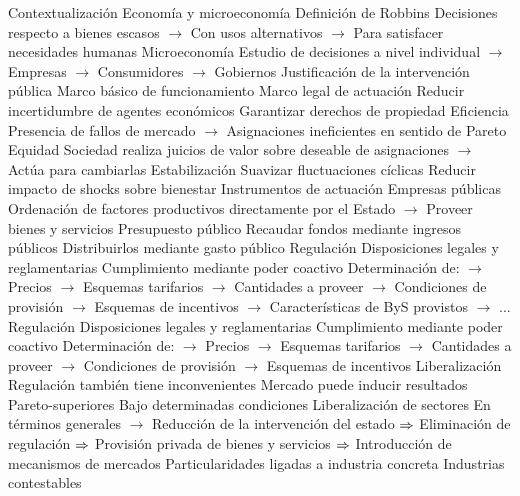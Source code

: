 \documentclass{nuevotema}
\begin{document}
\esquemalargo

\begin{esquemal}
	\1[] 
		\2 Contextualización
			\3 Economía y microeconomía
				\4 Definición de Robbins
				\4[] Decisiones respecto a bienes escasos
				\4[] $\to$ Con usos alternativos
				\4[] $\to$ Para satisfacer necesidades humanas
				\4 Microeconomía
				\4[] Estudio de decisiones a nivel individual
				\4[] $\to$ Empresas
				\4[] $\to$ Consumidores
				\4[] $\to$ Gobiernos
			\3 Justificación de la intervención pública
				\4 Marco básico de funcionamiento
				\4[] Marco legal de actuación
				\4[] Reducir incertidumbre de agentes económicos
				\4[] Garantizar derechos de propiedad
				\4 Eficiencia
				\4[] Presencia de fallos de mercado
				\4[] $\to$ Asignaciones ineficientes en sentido de Pareto
				\4 Equidad
				\4[] Sociedad realiza juicios de valor
				\4[] sobre deseable de asignaciones
				\4[] $\to$ Actúa para cambiarlas
				\4 Estabilización
				\4[] Suavizar fluctuaciones cíclicas
				\4[] Reducir impacto de shocks sobre bienestar
			\3 Instrumentos de actuación
				\4 Empresas públicas
				\4[] Ordenación de factores productivos
				\4[] directamente por el Estado
				\4[] $\to$ Proveer bienes y servicios
				\4 Presupuesto público
				\4[] Recaudar fondos mediante ingresos públicos
				\4[] Distribuirlos mediante gasto público
				\4 Regulación
				\4[] Disposiciones legales y reglamentarias
				\4[] Cumplimiento mediante poder coactivo
				\4[] Determinación de:
				\4[] $\to$ Precios
				\4[] $\to$ Esquemas tarifarios
				\4[] $\to$ Cantidades a proveer
				\4[] $\to$ Condiciones de provisión
				\4[] $\to$ Esquemas de incentivos
				\4[] $\to$ Características de ByS provistos
				\4[] $\to$ ...
			\3 Regulación
				\4 Disposiciones legales y reglamentarias
				\4 Cumplimiento mediante poder coactivo
				\4 Determinación de:
				\4[] $\to$ Precios
				\4[] $\to$ Esquemas tarifarios
				\4[] $\to$ Cantidades a proveer
				\4[] $\to$ Condiciones de provisión
				\4[] $\to$ Esquemas de incentivos
			\3 Liberalización
				\4 Regulación también tiene inconvenientes
				\4 Mercado puede inducir resultados Pareto-superiores
				\4[] Bajo determinadas condiciones
				\4 Liberalización de sectores
				\4[] En términos generales
				\4[] $\to$ Reducción de la intervención del estado
				\4[] $\Rightarrow$ Eliminación de regulación
				\4[] $\Rightarrow$ Provisión privada de bienes y servicios
				\4[] $\Rightarrow$ Introducción de mecanismos de mercados
				\4 Particularidades ligadas a industria concreta
				\4[] Industrias contestables

\end{esquemal}
\end{document}
